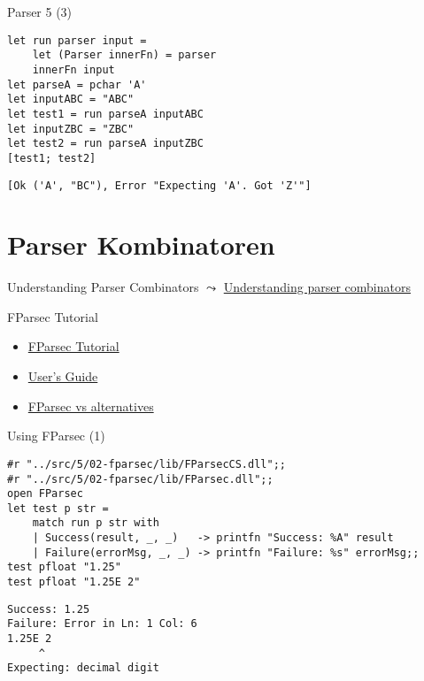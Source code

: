 \documentclass[t]{beamer}
\begin{document}
\begin{frame}[label={sec:org69ed02f},fragile]{Parser 5 (3)}
 \begin{verbatim}
let run parser input = 
    let (Parser innerFn) = parser 
    innerFn input
let parseA = pchar 'A' 
let inputABC = "ABC"
let test1 = run parseA inputABC
let inputZBC = "ZBC"
let test2 = run parseA inputZBC
[test1; test2] 
\end{verbatim}

\begin{verbatim}
[Ok ('A', "BC"), Error "Expecting 'A'. Got 'Z'"]
\end{verbatim}
\end{frame}

\section{Parser Kombinatoren }
\label{sec:orgdef080d}
\begin{frame}[label={sec:org58a946f}]{Understanding Parser Combinators}
\(\leadsto\) \href{./5 Understanding parser combinators.pdf}{Understanding parser combinators}
\end{frame}

\begin{frame}[label={sec:org114ffc3}]{FParsec Tutorial}
\begin{itemize}
\item \href{http://www.quanttec.com/fparsec/tutorial.html\#}{FParsec Tutorial}
\item \href{http://www.quanttec.com/fparsec/users-guide/}{User’s Guide}
\item \href{http://www.quanttec.com/fparsec/about/fparsec-vs-alternatives.html}{FParsec vs alternatives}
\end{itemize}
\end{frame}

\begin{frame}[label={sec:org1924775},fragile]{Using FParsec (1)}
 \begin{verbatim}
#r "../src/5/02-fparsec/lib/FParsecCS.dll";; 
#r "../src/5/02-fparsec/lib/FParsec.dll";;
open FParsec
let test p str =
    match run p str with
    | Success(result, _, _)   -> printfn "Success: %A" result
    | Failure(errorMsg, _, _) -> printfn "Failure: %s" errorMsg;;
test pfloat "1.25"
test pfloat "1.25E 2"
\end{verbatim}

\begin{verbatim}
Success: 1.25
Failure: Error in Ln: 1 Col: 6
1.25E 2
     ^
Expecting: decimal digit

\end{verbatim}
\end{frame}
\end{document}
